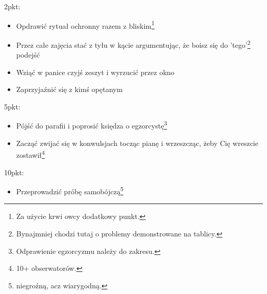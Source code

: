 \documentclass[11pt,a4paper,sans]{moderncv}        %
\begin{document}
2pkt:
\begin{itemize}
	\item Opdrawić rytuał ochronny razem z bliskim\footnote{Za użycie krwi owcy dodatkowy punkt.}
	\item Przez całe zajęcia stać z tyłu w kącie argumentując, że boisz się do 'tego'\footnote{Bynajmniej chodzi tutaj
			o problemy demonstrowane na tablicy.} podejść
	\item Wziąć w panice czyjś zeszyt i wyrzucić przez okno
	\item Zaprzyjaźnić się z kimś opętanym
\end{itemize}

5pkt:
\begin{itemize}
	\item Pójść do parafii i poprosić księdza o egzorcystę\footnote{Odprawienie egzorcyzmu należy do zakresu.}
	\item Zacząć zwijać się w konwulsjach tocząc pianę i wrzeszcząc, żeby Cię wreszcie zostawił\footnote{10+
		obserwatorów.}
\end{itemize}

10pkt:
\begin{itemize}
	\item Przeprowadzić próbę samobójczą\footnote{niegroźną, acz wiarygodną.}
\end{itemize}
\end{document}
